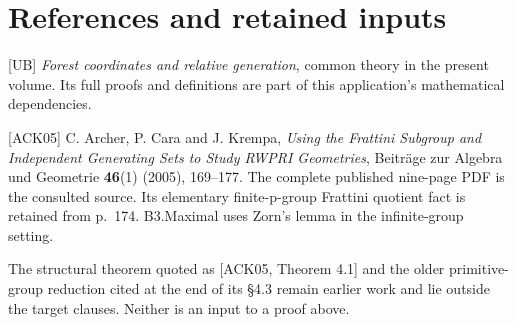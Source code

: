 \section*{References and retained inputs}
{[}UB{]} \emph{Forest coordinates and relative generation}, common theory in the present volume. Its full proofs and definitions are part of this application's mathematical dependencies.

{[}ACK05{]} C. Archer, P. Cara and J. Krempa, \emph{Using the Frattini Subgroup and Independent Generating Sets to Study RWPRI Geometries}, Beiträge zur Algebra und Geometrie \textbf{46}(1) (2005), 169--177. The complete published nine-page PDF is the consulted source. Its elementary finite-p-group Frattini quotient fact is retained from p.~174. B3.Maximal uses Zorn's lemma in the infinite-group setting.

The structural theorem quoted as {[}ACK05, Theorem 4.1{]} and the older primitive-group reduction cited at the end of its §4.3 remain earlier work and lie outside the target clauses. Neither is an input to a proof above.


